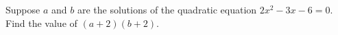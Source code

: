 Suppose $a$ and $b$ are the solutions of the quadratic equation $2x^2-3x-6=0$. Find the value of $(a+2)(b+2)$.
